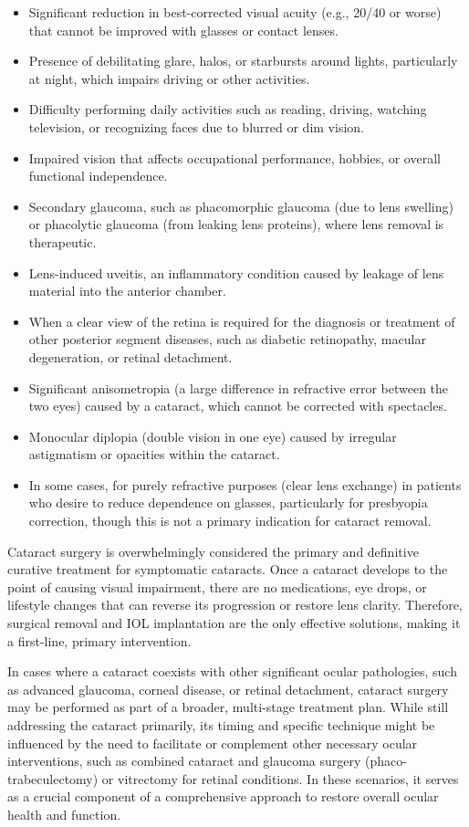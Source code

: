 \begin{itemize}
  \item Significant reduction in best-corrected visual acuity (e.g., 20/40 or worse) that cannot be improved with glasses or contact lenses.
  \item Presence of debilitating glare, halos, or starbursts around lights, particularly at night, which impairs driving or other activities.
  \item Difficulty performing daily activities such as reading, driving, watching television, or recognizing faces due to blurred or dim vision.
  \item Impaired vision that affects occupational performance, hobbies, or overall functional independence.
  \item Secondary glaucoma, such as phacomorphic glaucoma (due to lens swelling) or phacolytic glaucoma (from leaking lens proteins), where lens removal is therapeutic.
  \item Lens-induced uveitis, an inflammatory condition caused by leakage of lens material into the anterior chamber.
  \item When a clear view of the retina is required for the diagnosis or treatment of other posterior segment diseases, such as diabetic retinopathy, macular degeneration, or retinal detachment.
  \item Significant anisometropia (a large difference in refractive error between the two eyes) caused by a cataract, which cannot be corrected with spectacles.
  \item Monocular diplopia (double vision in one eye) caused by irregular astigmatism or opacities within the cataract.
  \item In some cases, for purely refractive purposes (clear lens exchange) in patients who desire to reduce dependence on glasses, particularly for presbyopia correction, though this is not a primary indication for cataract removal.
\end{itemize}

Cataract surgery is overwhelmingly considered the primary and definitive curative treatment for symptomatic cataracts. Once a cataract develops to the point of causing visual impairment, there are no medications, eye drops, or lifestyle changes that can reverse its progression or restore lens clarity. Therefore, surgical removal and IOL implantation are the only effective solutions, making it a first-line, primary intervention.

In cases where a cataract coexists with other significant ocular pathologies, such as advanced glaucoma, corneal disease, or retinal detachment, cataract surgery may be performed as part of a broader, multi-stage treatment plan. While still addressing the cataract primarily, its timing and specific technique might be influenced by the need to facilitate or complement other necessary ocular interventions, such as combined cataract and glaucoma surgery (phaco-trabeculectomy) or vitrectomy for retinal conditions. In these scenarios, it serves as a crucial component of a comprehensive approach to restore overall ocular health and function.

